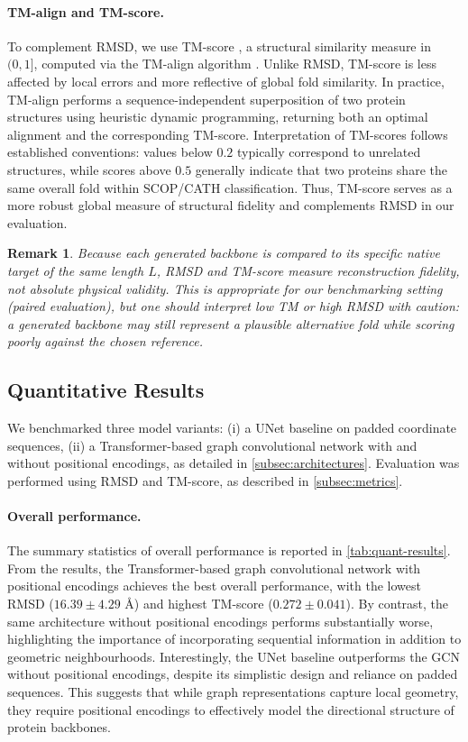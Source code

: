 \documentclass[a4paper,12pt]{article}
\newtheorem{remark}{Remark}[section]
\begin{document}
\paragraph{TM-align and TM-score.}
To complement RMSD, we use TM-score \citep{zhang2004ScoringFunctionAutomated,xu2010HowSignificantProtein}, a structural similarity measure in \((0,1]\), computed via the TM-align algorithm \citep{zhang2005TMalignProteinStructure}. Unlike RMSD, TM-score is less affected by local errors and more reflective of global fold similarity. In practice, TM-align performs a sequence-independent superposition of two protein structures using heuristic dynamic programming, returning both an optimal alignment and the corresponding TM-score. Interpretation of TM-scores follows established conventions: values below \(0.2\) typically correspond to unrelated structures, while scores above \(0.5\) generally indicate that two proteins share the same overall fold within SCOP/CATH classification. Thus, TM-score serves as a more robust global measure of structural fidelity and complements RMSD in our evaluation.

\begin{remark}
    Because each generated backbone is compared to its specific native target of the same length \(L\), RMSD and TM-score measure reconstruction fidelity, not absolute physical validity. This is appropriate for our benchmarking setting (paired evaluation), but one should interpret low TM or high RMSD with caution: a generated backbone may still represent a plausible alternative fold while scoring poorly against the chosen reference.
\end{remark}

\subsection{Quantitative Results}\label{subsec:results}
We benchmarked three model variants: (i) a UNet baseline on padded coordinate 
sequences, (ii) a Transformer-based graph convolutional network with and without positional 
encodings, as detailed in \cref{subsec:architectures}. Evaluation was performed using RMSD and TM-score, as described in \cref{subsec:metrics}.

\paragraph{Overall performance.}
The summary statistics of overall performance is reported in \cref{tab:quant-results}. From the results, the Transformer-based graph convolutional network with positional encodings achieves the best overall performance, with the lowest RMSD (\(16.39 \pm 4.29\) \AA) and highest TM-score (\(0.272 \pm 0.041\)). By contrast, the same architecture without positional encodings performs substantially worse, highlighting the importance of incorporating sequential information in addition to geometric neighbourhoods. Interestingly, the UNet baseline outperforms the GCN without positional encodings, despite its simplistic design and reliance on padded sequences. This suggests that while graph representations capture local geometry, they require positional encodings to effectively model the directional structure of protein backbones.
\end{document}
